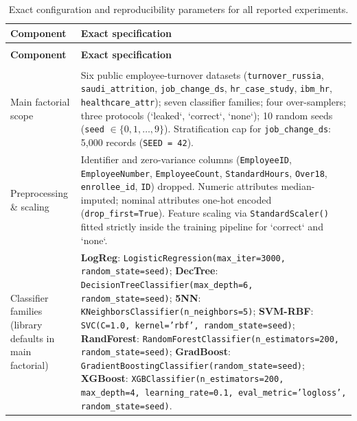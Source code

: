 \documentclass[12pt,a4paper]{article}
\renewcommand{\arraystretch}{1.2}
\begin{document}
\setcounter{table}{0}
\renewcommand{\thetable}{A\arabic{table}}
\begingroup
\footnotesize
\renewcommand{\arraystretch}{1.12}
\singlespacing
\begin{longtable}{@{}>{\raggedright\arraybackslash}p{}>{\raggedright\arraybackslash}p{}@{}}
\caption{Exact configuration and reproducibility parameters for all reported experiments.}\label{tab:configuration}\\
\toprule
\textbf{Component} & \textbf{Exact specification} \\
\midrule
\endfirsthead
\multicolumn{2}{l}{\tablename\ \thetable\ continued} \\
\toprule
\textbf{Component} & \textbf{Exact specification} \\
\midrule
\endhead
\midrule
\multicolumn{2}{r}{Continued on next page} \\
\endfoot
\bottomrule
\endlastfoot
Main factorial scope & Six public employee-turnover datasets (\texttt{turnover\_russia}, \texttt{saudi\_attrition}, \texttt{job\_change\_ds}, \texttt{hr\_case\_study}, \texttt{ibm\_hr}, \texttt{healthcare\_attr}); seven classifier families; four over-samplers; three protocols (`leaked`, `correct`, `none`); 10 random seeds (\texttt{seed} $\in \{0, 1, \dots, 9\}$). Stratification cap for \texttt{job\_change\_ds}: 5,000 records (\texttt{SEED = 42}). \\
Preprocessing \& scaling & Identifier and zero-variance columns (\texttt{EmployeeID}, \texttt{EmployeeNumber}, \texttt{EmployeeCount}, \texttt{StandardHours}, \texttt{Over18}, \texttt{enrollee\_id}, \texttt{ID}) dropped. Numeric attributes median-imputed; nominal attributes one-hot encoded (\texttt{drop\_first=True}). Feature scaling via \texttt{StandardScaler()} fitted strictly inside the training pipeline for `correct` and `none`. \\
Classifier families (library defaults in main factorial) & \textbf{LogReg}: \texttt{LogisticRegression(max\_iter=3000, random\_state=seed)}; \textbf{DecTree}: \texttt{DecisionTreeClassifier(max\_depth=6, random\_state=seed)}; \textbf{5NN}: \texttt{KNeighborsClassifier(n\_neighbors=5)}; \textbf{SVM-RBF}: \texttt{SVC(C=1.0, kernel='rbf', random\_state=seed)}; \textbf{RandForest}: \texttt{RandomForestClassifier(n\_estimators=200, random\_state=seed)}; \textbf{GradBoost}: \texttt{GradientBoostingClassifier(random\_state=seed)}; \textbf{XGBoost}: \texttt{XGBClassifier(n\_estimators=200, max\_depth=4, learning\_rate=0.1, eval\_metric='logloss', random\_state=seed)}. \\

\end{longtable}
\end{document}
